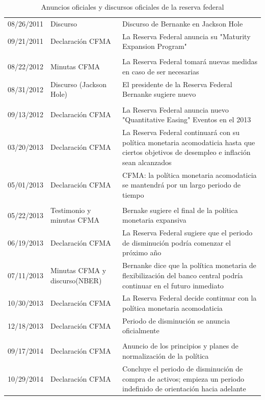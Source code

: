 \documentclass[
  9.5pt,
]{article}
\begin{document}
\begin{table}[H]
\begin{center}
{\begin{tabular}{| m{3cm} | m{5cm} | m{15cm} |}
08/26/2011  & Discurso  & Discurso de Bernanke en Jackson Hole \\
09/21/2011  & Declaración CFMA &    La Reserva Federal anuncia su "Maturity Expansion Program" \\
\rowcolor{Gray}\multicolumn{3}{|c|}{"Third LSAP"} \\ \hline
08/22/2012  & Minutas CFMA &    La Reserva Federal tomará nuevas medidas en caso de ser necesarias \\
08/31/2012  & Discurso (Jackson Hole) & El presidente de la Reserva Federal Bernanke sugiere nuevo \\
\rowcolor{Gray}\multicolumn{3}{|c|}{"Quantitative Easing"} \\ \hline
09/13/2012  & Declaración CFMA &    La Reserva Federal anuncia nuevo "Quantitative Easing"
Eventos en el 2013 \\
03/20/2013  & Declaración CFMA  & La Reserva Federal continuará con su política monetaria acomodaticia hasta que ciertos objetivos de desempleo e inflación sean alcanzados \\
05/01/2013  & Declaración CFMA &    CFMA: la política monetaria acomodaticia se mantendrá por un largo periodo de tiempo \\
\rowcolor{Gray}\multicolumn{3}{|c|}{"Taper Talk Period"} \\ \hline
05/22/2013  & Testimonio y minutas CFMA &   Bernake sugiere el final de la política monetaria expansiva \\
06/19/2013  & Declaración CFMA  & La Reserva Federal sugiere que el periodo de disminución podría comenzar el próximo año \\
07/11/2013  & Minutas CFMA y discurso(NBER) & Bernanke dice que la política monetaria de flexibilización del banco central podría continuar en el futuro inmediato \\
10/30/2013 & Declaración CFMA   & La Reserva Federal decide continuar con la política monetaria acomodaticia \\
12/18/2013  & Declaración CFMA &    Periodo de disminución se anuncia oficialmente  \\
\rowcolor{Gray}\multicolumn{3}{|c|}{Eventos en el 2014} \\ \hline
09/17/2014  & Declaración CFMA  & Anuncio de los principios y planes de normalización de la política \\
10/29/2014 &    Declaración CFMA &  Concluye el periodo de disminución de compra de activos; empieza  un periodo indefinido de orientación hacia adelante \\ \hline
    \end{tabular}
  }
    \caption{Anuncios oficiales y discursos oficiales de la reserva federal}
  \end{center}
\end{table}
\end{document}
